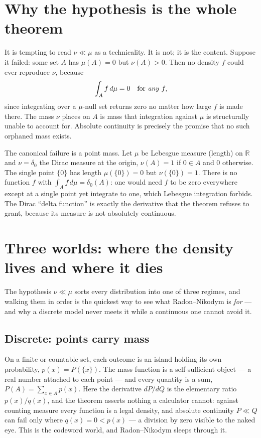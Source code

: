 \documentclass[11pt]{article}
\begin{document}
\section{Why the hypothesis is the whole theorem}

It is tempting to read $\nu \ll \mu$ as a technicality. It is not; it is the content. Suppose
it failed: some set $A$ has $\mu(A) = 0$ but $\nu(A) > 0$. Then no density $f$ could ever
reproduce $\nu$, because
\[
  \int_A f \, d\mu = 0 \quad\text{for \emph{any} } f,
\]
since integrating over a $\mu$-null set returns zero no matter how large $f$ is made there.
The mass $\nu$ places on $A$ is mass that integration against $\mu$ is structurally unable to
account for. Absolute continuity is precisely the promise that no such orphaned mass exists.

The canonical failure is a point mass. Let $\mu$ be Lebesgue measure (length) on
$\mathbb{R}$ and $\nu = \delta_0$ the Dirac measure at the origin, $\nu(A) = 1$ if $0 \in A$
and $0$ otherwise. The single point $\{0\}$ has length $\mu(\{0\}) = 0$ but
$\nu(\{0\}) = 1$. There is no function $f$ with $\int_A f\,d\mu = \delta_0(A)$: one would need
$f$ to be zero everywhere except at a single point yet integrate to one, which Lebesgue
integration forbids. The Dirac ``delta function'' is exactly the derivative that the theorem
refuses to grant, because its measure is not absolutely continuous.

\section{Three worlds: where the density lives and where it dies}

The hypothesis $\nu \ll \mu$ sorts every distribution into one of three regimes, and walking
them in order is the quickest way to see what Radon--Nikodym is \emph{for} --- and why a
discrete model never meets it while a continuous one cannot avoid it.

\subsection*{Discrete: points carry mass}

On a finite or countable set, each outcome is an island holding its own probability,
$p(x) = P(\{x\})$. The mass function is a self-sufficient object --- a real number attached to
each point --- and every quantity is a sum, $P(A) = \sum_{x \in A} p(x)$. Here the derivative
$dP/dQ$ is the elementary ratio $p(x)/q(x)$, and the theorem asserts nothing a calculator
cannot: against counting measure every function is a legal density, and absolute continuity
$P \ll Q$ can fail only where $q(x) = 0 < p(x)$ --- a division by zero visible to the naked
eye. This is the codeword world, and Radon--Nikodym sleeps through it.
\end{document}
